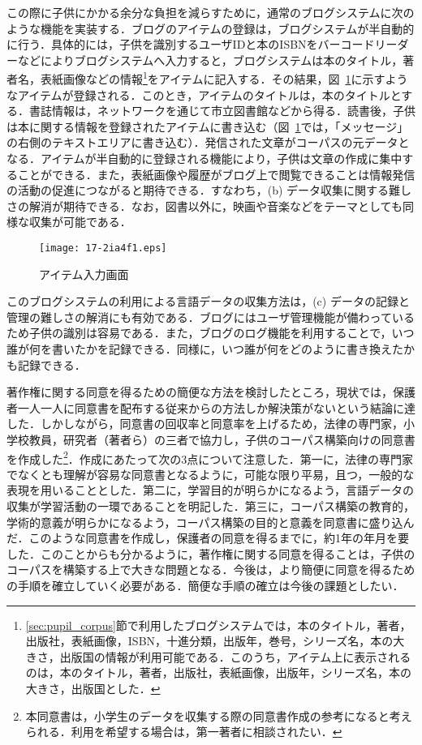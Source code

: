 \documentclass[japanese]{jnlp_1.4}
\begin{document}
  この際に子供にかかる余分な負担を減らすために，通常のブログシステムに次のような機能を実装する．ブログのアイテムの登録は，ブログシステムが半自動的に行う．具体的には，子供を識別するユーザIDと本のISBNをバーコードリーダーなどによりブログシステムへ入力すると，ブログシステムは本のタイトル，著者名，表紙画像などの情報\footnote{\ref{sec:pupil_corpus}節で利用したブログシステムでは，本のタイトル，著者，出版社，表紙画像，ISBN，十進分類，出版年，巻号，シリーズ名，本の大きさ，出版国の情報が利用可能である．このうち，アイテム上に表示されるのは，本のタイトル，著者，出版社，表紙画像，出版年，シリーズ名，本の大きさ，出版国とした．}をアイテムに記入する．その結果，図~\ref{fig:image}に示すようなアイテムが登録される．このとき，アイテムのタイトルは，本のタイトルとする．書誌情報は，ネットワークを通じて市立図書館などから得る．読書後，子供は本に関する情報を登録されたアイテムに書き込む（図~\ref{fig:image}では，「メッセージ」の右側のテキストエリアに書き込む）．発信された文章がコーパスの元データとなる．アイテムが半自動的に登録される機能により，子供は文章の作成に集中することができる．また，表紙画像や履歴がブログ上で閲覧できることは情報発信の活動の促進につながると期待できる\cite{reuter,suda2}．すなわち，(b) データ収集に関する難しさの解消が期待できる．なお，図書以外に，映画や音楽などをテーマとしても同様な収集が可能である．


\begin{figure}[t]
\begin{center}
\texttt{[image: 17-2ia4f1.eps]}
\end{center}
\caption{アイテム入力画面}\label{fig:image}
\end{figure}

  このブログシステムの利用による言語データの収集方法は，(c) データの記録と管理の難しさの解消にも有効である．ブログにはユーザ管理機能が備わっているため子供の識別は容易である．また，ブログのログ機能を利用することで，いつ誰が何を書いたかを記録できる．同様に，いつ誰が何をどのように書き換えたかも記録できる．


  著作権に関する同意を得るための簡便な方法を検討したところ，現状では，保護者一人一人に同意書を配布する従来からの方法しか解決策がないという結論に達した．しかしながら，同意書の回収率と同意率を上げるため，法律の専門家，小学校教員，研究者（著者ら）の三者で協力し，子供のコーパス構築向けの同意書を作成した\footnote{本同意書は，小学生のデータを収集する際の同意書作成の参考になると考えられる．利用を希望する場合は，第一著者に相談されたい．}．作成にあたって次の3点について注意した．第一に，法律の専門家でなくとも理解が容易な同意書となるように，可能な限り平易，且つ，一般的な表現を用いることとした．第二に，学習目的が明らかになるよう，言語データの収集が学習活動の一環であることを明記した．第三に，コーパス構築の教育的，学術的意義が明らかになるよう，コーパス構築の目的と意義を同意書に盛り込んだ．このような同意書を作成し，保護者の同意を得るまでに，約1年の年月を要した．このことからも分かるように，著作権に関する同意を得ることは，子供のコーパスを構築する上で大きな問題となる．今後は，より簡便に同意を得るための手順を確立していく必要がある．簡便な手順の確立は今後の課題としたい．
\end{document}
